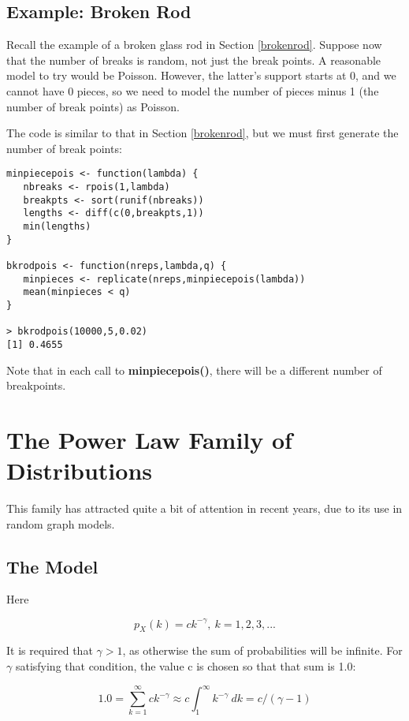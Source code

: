 \subsection{Example: Broken Rod}

Recall the example of a broken glass rod in Section \ref{brokenrod}.
Suppose now that the number of breaks is random, not just the break
points.  A reasonable model to try would be Poisson.  However, 
the latter's support starts at 0, and we cannot have 0 pieces,
so we need to model the number of pieces minus 1 (the number of break
points) as Poisson.

The code is similar to that in Section \ref{brokenrod}, but we must
first generate the number of break points:

\begin{lstlisting}
minpiecepois <- function(lambda) {
   nbreaks <- rpois(1,lambda)
   breakpts <- sort(runif(nbreaks))
   lengths <- diff(c(0,breakpts,1))
   min(lengths)
}

bkrodpois <- function(nreps,lambda,q) {
   minpieces <- replicate(nreps,minpiecepois(lambda))
   mean(minpieces < q) 
}

> bkrodpois(10000,5,0.02)  
[1] 0.4655
\end{lstlisting}

Note that in each call to {\bf minpiecepois()}, there will be a
different number of breakpoints.

\section{The Power Law Family of Distributions}

This family has attracted quite a bit of attention in recent years, due
to its use in random graph models.

\subsection{The Model}

Here

\begin{equation}
p_X(k) = c k^{-\gamma}, ~ k = 1,2,3,...
\end{equation}

It is required that $\gamma > 1$, as otherwise the sum of probabilities
will be infinite.  For $\gamma$ satisfying that condition, the value c
is chosen so that that sum is 1.0:

\begin{equation}
1.0 = \sum_{k=1}^{\infty} c k^{-\gamma} \approx
c \int_1^{\infty} k^{-\gamma} ~ dk = c/(\gamma - 1)
\end{equation}

